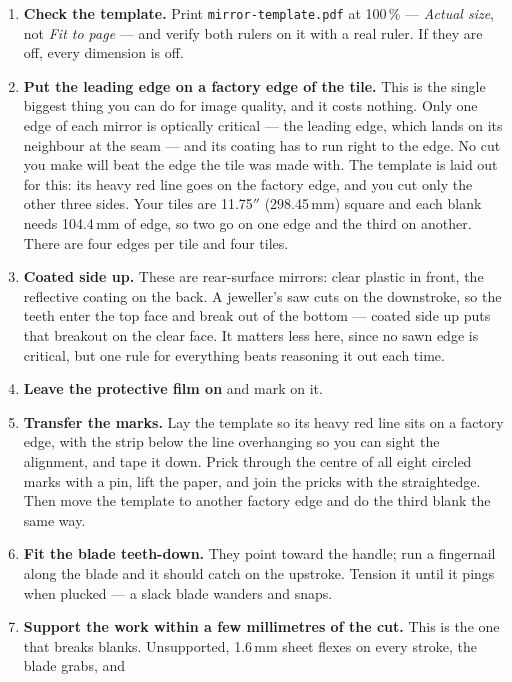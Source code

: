 \documentclass[letterpaper,11pt]{article}
\begin{document}
\begin{enumerate}[leftmargin=*]
\item \textbf{Check the template.} Print \texttt{mirror-template.pdf} at 100\,\% ---
      \emph{Actual size}, not \emph{Fit to page} --- and verify both rulers on it with a
      real ruler. If they are off, every dimension is off.
\item \textbf{Put the leading edge on a factory edge of the tile.} This is the single
      biggest thing you can do for image quality, and it costs nothing. Only one edge of
      each mirror is optically critical --- the leading edge, which lands on its neighbour
      at the seam --- and its coating has to run right to the edge. No cut you make will beat
      the edge the tile was made with. The template is laid out for this: its heavy red
      line goes on the factory edge, and you cut only the other three sides. Your tiles are
      11.75$''$ (298.45\,mm) square and each blank needs 104.4\,mm of edge, so two go on one
      edge and the third on another. There are four edges per tile and four tiles.
\item \textbf{Coated side up.} These are rear-surface mirrors: clear plastic in front, the
      reflective coating on the back. A jeweller's saw cuts on the downstroke, so the teeth
      enter the top face and break out of the bottom --- coated side up puts that breakout
      on the clear face. It matters less here, since no sawn edge is critical, but
      one rule for everything beats reasoning it out each time.
\item \textbf{Leave the protective film on} and mark on it.
\item \textbf{Transfer the marks.} Lay the template so its heavy red line sits on a factory
      edge, with the strip below the line overhanging so you can sight the alignment, and
      tape it down. Prick through the centre of all eight circled marks with a pin, lift the
      paper, and join the pricks with the straightedge. Then move the template to another
      factory edge and do the third blank the same way.
\item \textbf{Fit the blade teeth-down.} They point toward the handle; run a fingernail
      along the blade and it should catch on the upstroke. Tension it until it pings when
      plucked --- a slack blade wanders and snaps.
\item \textbf{Support the work within a few millimetres of the cut.} This is the one that
      breaks blanks. Unsupported, 1.6\,mm sheet flexes on every stroke, the blade grabs, and

\end{enumerate}
\end{document}
